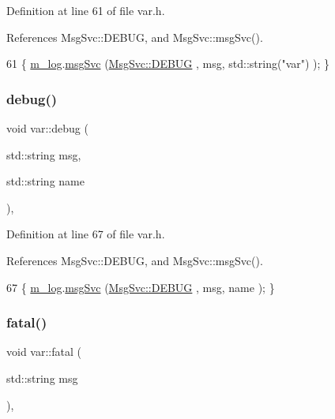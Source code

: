 Definition at line 61 of file var.\+h.



References Msg\+Svc\+::\+D\+E\+B\+UG, and Msg\+Svc\+::msg\+Svc().


\begin{DoxyCode}
61 \{ \hyperlink{classvar_a5dfdc5180270038b686ad3013874a026}{m\_log}.\hyperlink{classMsgSvc_ad25f18047920cc59a314e5098259711c}{msgSvc} (\hyperlink{classMsgSvc_ae671eb7301996cd049d2da8a65925926a1dbdcc82dce88370ec335883c83b38b0}{MsgSvc::DEBUG}   , msg, std::string(\textcolor{stringliteral}{"var"}) ); \}
\end{DoxyCode}
\mbox{\label{classvar_afe9c80c1fab5c210a628bb29df513935}} 
\subsubsection{\texorpdfstring{debug()}{debug()}\hspace{0.1cm}{\footnotesize\ttfamily [2/2]}}
{\footnotesize\ttfamily void var\+::debug (\begin{DoxyParamCaption}\item[{std\+::string}]{msg,  }\item[{std\+::string}]{name }\end{DoxyParamCaption})\hspace{0.3cm}{\ttfamily [inline]}, {\ttfamily [private]}}



Definition at line 67 of file var.\+h.



References Msg\+Svc\+::\+D\+E\+B\+UG, and Msg\+Svc\+::msg\+Svc().


\begin{DoxyCode}
67 \{ \hyperlink{classvar_a5dfdc5180270038b686ad3013874a026}{m\_log}.\hyperlink{classMsgSvc_ad25f18047920cc59a314e5098259711c}{msgSvc} (\hyperlink{classMsgSvc_ae671eb7301996cd049d2da8a65925926a1dbdcc82dce88370ec335883c83b38b0}{MsgSvc::DEBUG}   , msg, name ); \}
\end{DoxyCode}
\mbox{\label{classvar_a2f23892af2d80d27ebb8032f89d875f2}} 
\subsubsection{\texorpdfstring{fatal()}{fatal()}\hspace{0.1cm}{\footnotesize\ttfamily [1/2]}}
{\footnotesize\ttfamily void var\+::fatal (\begin{DoxyParamCaption}\item[{std\+::string}]{msg }\end{DoxyParamCaption})\hspace{0.3cm}{\ttfamily [inline]}, {\ttfamily [private]}}



